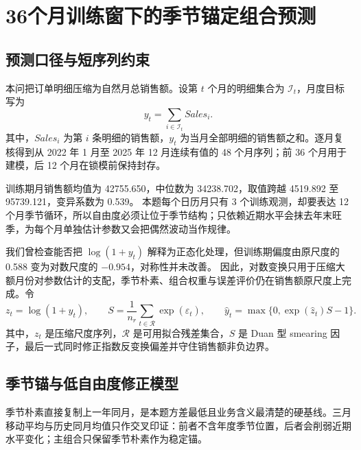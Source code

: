 \section{36个月训练窗下的季节锚定组合预测} %

\subsection{预测口径与短序列约束}

本问把订单明细压缩为自然月总销售额。设第 $t$ 个月的明细集合为 $\mathcal I_t$，月度目标写为
\begin{equation}
    y_t=\sum_{i\in\mathcal I_t}Sales_i .
\end{equation}
其中，$Sales_i$ 为第 $i$ 条明细的销售额，$y_t$ 为当月全部明细的销售额之和。逐月复核得到从 2022 年 1 月至 2025 年 12 月连续有值的 48 个月序列；前 36 个月用于建模，后 12 个月在锁模前保持封存。%

训练期月销售额均值为 42755.650，中位数为 34238.702，取值跨越 4519.892 至 95739.121，变异系数为 0.539。%
本题每个日历月只有 3 个训练观测，却要表达 12 个月季节循环，所以自由度必须让位于季节结构；只依赖近期水平会抹去年末旺季，为每个月单独估计参数又会把偶然波动当作规律。%

我们曾检查能否把 $\log(1+y_t)$ 解释为正态化处理，但训练期偏度由原尺度的 0.588 变为对数尺度的 $-0.954$，对称性并未改善。%
因此，对数变换只用于压缩大额月份对参数估计的支配，季节朴素、组合权重与误差评价仍在销售额原尺度上完成。令
\begin{equation}
    z_t=\log(1+y_t),\qquad
    S=\frac{1}{n_r}\sum_{t\in\mathcal R}\exp(\widehat\varepsilon_t),\qquad
    \widehat y_t=\max\{0,\exp(\widehat z_t)S-1\}.
\end{equation}
其中，$z_t$ 是压缩尺度序列，$\mathcal R$ 是可用拟合残差集合，$S$ 是 Duan 型 smearing 因子\cite{duan1983smearing}，最后一式同时修正指数反变换偏差并守住销售额非负边界。%

\subsection{季节锚与低自由度修正模型}

季节朴素直接复制上一年同月，是本题方差最低且业务含义最清楚的硬基线\cite{hyndman2021forecasting}。三月移动平均与历史同月均值只作交叉印证：前者不含年度季节位置，后者会削弱近期水平变化；主组合只保留季节朴素作为稳定锚。%

